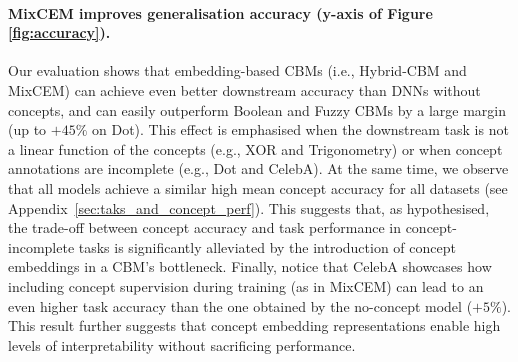 \documentclass[withindex,glossary]{cam-thesis}
\theoremstyle{plain}
\theoremstyle{definition}
\theoremstyle{remark}
\begin{document}
\paragraph{MixCEM improves generalisation accuracy (y-axis of Figure \ref{fig:accuracy}).}
Our evaluation shows that embedding-based CBMs (i.e., Hybrid-CBM and MixCEM) can achieve even better downstream accuracy than DNNs without concepts, and can easily outperform Boolean and Fuzzy CBMs by a large margin (up to $+45\%$ on Dot). This effect is emphasised when the downstream task is not a linear function of the concepts (e.g., XOR and Trigonometry) or when concept annotations are incomplete (e.g., Dot and CelebA). At the same time, we observe that all models achieve a similar high mean concept accuracy for all datasets (see Appendix~\ref{sec:taks_and_concept_perf}). This suggests that, as hypothesised, the trade-off between concept accuracy and task performance in concept-incomplete tasks is significantly alleviated by the introduction of concept embeddings in a CBM's bottleneck. Finally, notice that CelebA showcases how including concept supervision during training (as in MixCEM) can lead to an even higher task accuracy than the one obtained by the no-concept model ($+5\%$). This result further suggests that concept embedding representations enable high levels of interpretability without sacrificing performance.


\end{document}
